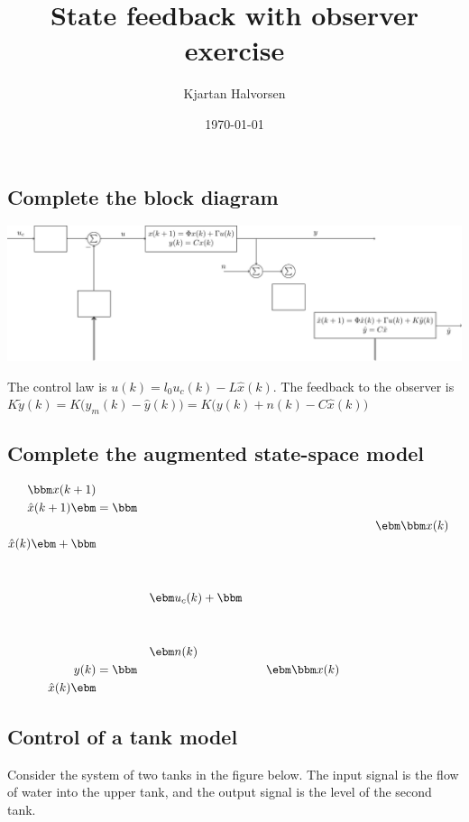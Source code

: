 \documentclass[letterpaper]{scrartcl}
\author{Kjartan Halvorsen}
\date{\today}
\title{State feedback with observer exercise}
\begin{document}
\maketitle

\subsection*{Complete the block diagram}
\label{sec-0-1}
\begin{center}
\includegraphics[width=\linewidth]{../../figures/state-feedback-with-observer-incomplete}
\end{center}

The control law is \(u(k) = l_0u_c(k) - L\hat{x}(k)\). The feedback to the observer is \(K\tilde{y}(k) = K\big(y_m(k) - \hat{y}(k)\big) = K\big(y(k) + n(k) - C\hat{x}(k)\big) \) 


\subsection*{Complete the augmented state-space model}
\label{sec-0-2}

\begin{align*}
\bbm x(k+1)\\\hat{x}(k+1) \ebm &= \bbm & & & & & & & &&& & & &\\ &&& & & & & & & & & & &\ebm \bbm x(k)\\\hat{x}(k)\ebm + \bbm &&&\\&&&\\&&&\\&&& \ebm u_c(k) + \bbm &&&\\&&&\\&&&\\&&& \ebm n(k)\\
y(k) &= \bbm &&&&&& \ebm \bbm x(k)\\\hat{x}(k)\ebm
\end{align*}

\newpage

\subsection*{Control of a tank model}
\label{sec-0-3}
Consider the system of two tanks in the figure below. The input signal is the flow of water into the upper tank, and the output signal is the level of the second tank. 
\end{document}

